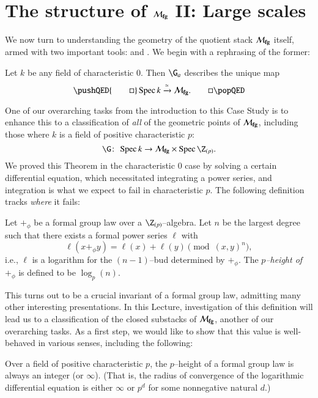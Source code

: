 \section{The structure of \texorpdfstring{$\mathcal{M}_{\mathbf{fg}}$}{Mfg} II: Large scales}\label{MfgII:LargeScales}

We now turn to understanding the geometry of the quotient stack $\mathcal{M}_{\mathbf{fg}}$ itself, armed with two important tools:  and .  We begin with a rephrasing of the former:

\begin{theorem}\label{RationalGeometricPointsOfMfg}
Let $k$ be any field of characteristic $0$.  Then $\G_a$ describes the unique map
\[\pushQED{\qed}
\Spec k \xrightarrow{\simeq} \moduli{fg}. \qedhere
\popQED\]
\end{theorem}

One of our overarching tasks from the introduction to this Case Study is to enhance this to a classification of \emph{all} of the geometric points of $\mathcal{M}_{\mathbf{fg}}$, including those where $k$ is a field of positive characteristic $p$: \[\G\co \Spec k \to \moduli{fg} \times \Spec \Z_{(p)}.\]  We proved this Theorem in the characteristic $0$ case by solving a certain differential equation, which necessitated integrating a power series, and integration is what we expect to fail in characteristic $p$.  The following definition tracks \emph{where} it fails:
\begin{definition}
Let $+_\phi$ be a formal group law over a $\Z_{(p)}$--algebra.  Let $n$ be the largest degree such that there exists a formal power series $\ell$ with \[\ell(x +_\phi y) = \ell(x) + \ell(y) \pmod{(x, y)^{n}},\] i.e., $\ell$ is a logarithm for the $(n-1)$--bud determined by $+_\phi$.  The \textit{$p$--height of $+_\phi$} is defined to be $\log_p(n)$.
\end{definition}

This turns out to be a crucial invariant of a formal group law, admitting many other interesting presentations.  In this Lecture, investigation of this definition will lead us to a classification of the closed substacks of $\mathcal{M}_{\mathbf{fg}}$, another of our overarching tasks.  As a first step, we would like to show that this value is well-behaved in various senses, including the following:
\begin{lemma}\label{FGLHeightIsAnInteger}
Over a field of positive characteristic $p$, the $p$--height of a formal group law is always an integer (or $\infty$).  (That is, the radius of convergence of the logarithmic differential equation is either $\infty$ or $p^d$ for some nonnegative natural $d$.)
\end{lemma}

